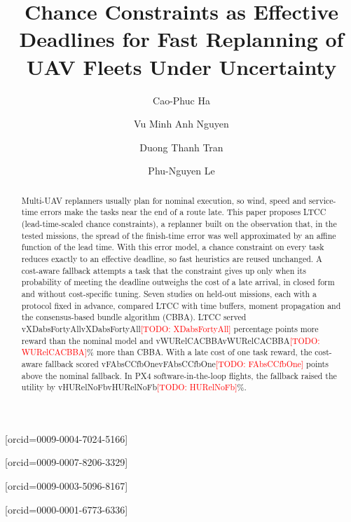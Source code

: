 \documentclass[a4paper,fleqn]{cas-dc}
\newcommand{\todo}[1]{\textcolor{red}{[TODO: #1]}}
\newcommand{\mname}{LTCC}  %
\newcommand{\val}[1]{\ifcsname v#1\endcsname\csname v#1\endcsname\else\todo{#1}\fi}
\newcounter{prop}
\begin{document}
\let\WriteBookmarks\relax



\title[mode=title]{Chance Constraints as Effective Deadlines for Fast Replanning of UAV Fleets Under Uncertainty}

\author[1]{Cao-Phuc Ha}[orcid=0009-0004-7024-5166]

\author[1]{Vu Minh Anh Nguyen}[orcid=0009-0007-8206-3329]

\author[2]{Duong Thanh Tran}[orcid=0009-0003-5096-8167]

\author[3]{Phu-Nguyen Le}[orcid=0000-0001-6773-6336]
\cormark[1]



\begin{abstract}
Multi-UAV replanners usually plan for nominal execution, so wind, speed and service-time errors make the tasks near the
end of a route late. This paper proposes \mname{} (lead-time-scaled chance constraints), a
replanner built on the observation that, in the tested missions, the
spread of the finish-time error was well approximated by an affine function of the lead time. With this error model, a
chance constraint on every task reduces exactly to an effective deadline, so fast heuristics are reused unchanged. A cost-aware fallback attempts a task that the constraint gives up only when its probability of meeting the
deadline outweighs the cost of a late arrival, in closed form and without cost-specific tuning. Seven studies on
held-out missions, each with a protocol fixed in advance, compared \mname{} with time buffers, moment propagation and
the consensus-based bundle algorithm (CBBA). \mname{} served \val{XDabsFortyAll} percentage points more reward than the
nominal model and \val{WURelCACBBA}\% more than CBBA. With a late cost of one task reward, the cost-aware fallback
scored \val{FAbsCCfbOne} points above the nominal fallback. In PX4 software-in-the-loop flights, the fallback raised the
utility by \val{HURelNoFb}\%.
\end{abstract}
\end{document}
